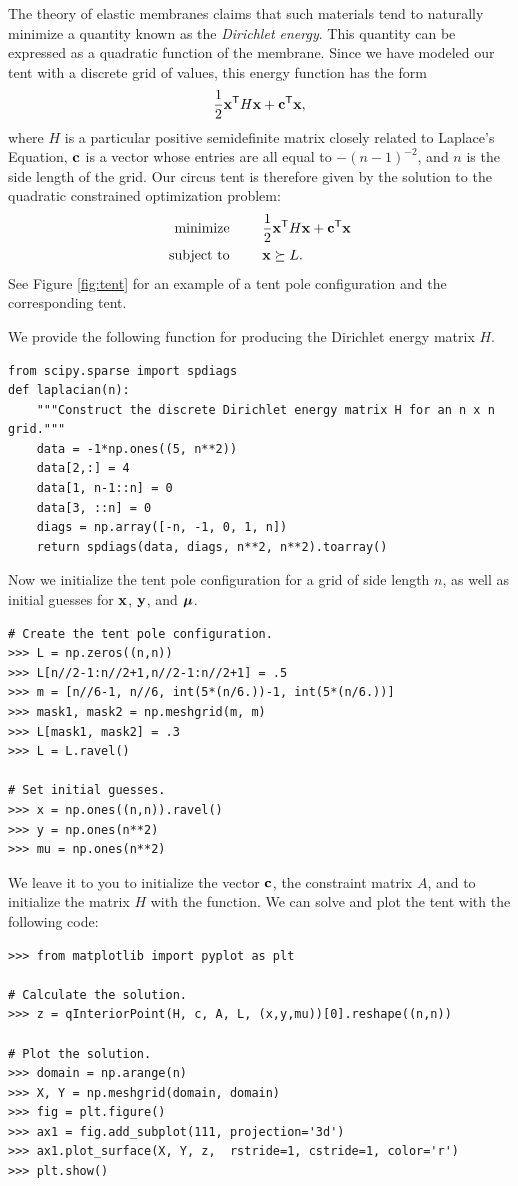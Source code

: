 The theory of elastic membranes claims that such materials tend to naturally minimize a quantity known as the \emph{Dirichlet energy}.
This quantity can be expressed as a quadratic function of the membrane.
Since we have modeled our tent with a discrete grid of values, this energy function has the form \[\frac{1}{2}\mathbf{x}^{\mathsf T}  H \mathbf{x} + \mathbf{c}^{\mathsf T}  \mathbf{x},\] where $H$ is a particular positive semidefinite matrix closely related to Laplace's Equation, $\mathbf{c}$ is a vector whose entries are all equal to $-(n-1)^{-2}$, and $n$ is the side length of the grid.
Our circus tent is therefore given by the solution to the quadratic constrained optimization problem:
\begin{align*}
\text{minimize }\qquad &\frac{1}{2}\mathbf{x}^{\mathsf T}  H \mathbf{x} + \mathbf{c}^{\mathsf T}  \mathbf{x}\\
\text{subject to }\qquad &\mathbf{x} \succeq L.\\
\end{align*}
See Figure \ref{fig:tent} for an example of a tent pole configuration and the corresponding tent.

We provide the following function for producing the Dirichlet energy matrix $H$.
\begin{lstlisting}
from scipy.sparse import spdiags
def laplacian(n):
    """Construct the discrete Dirichlet energy matrix H for an n x n grid."""
    data = -1*np.ones((5, n**2))
    data[2,:] = 4
    data[1, n-1::n] = 0
    data[3, ::n] = 0
    diags = np.array([-n, -1, 0, 1, n])
    return spdiags(data, diags, n**2, n**2).toarray()
\end{lstlisting}
Now we initialize the tent pole configuration for a grid of side length $n$, as well as initial guesses for $\mathbf{x}$, $\mathbf{y}$, and $\boldsymbol{\mu}$.
\begin{lstlisting}
# Create the tent pole configuration.
>>> L = np.zeros((n,n))
>>> L[n//2-1:n//2+1,n//2-1:n//2+1] = .5
>>> m = [n//6-1, n//6, int(5*(n/6.))-1, int(5*(n/6.))]
>>> mask1, mask2 = np.meshgrid(m, m)
>>> L[mask1, mask2] = .3
>>> L = L.ravel()

# Set initial guesses.
>>> x = np.ones((n,n)).ravel()
>>> y = np.ones(n**2)
>>> mu = np.ones(n**2)
\end{lstlisting}
We leave it to you to initialize the vector $\mathbf{c}$, the constraint matrix $A$,
and to initialize the matrix $H$ with the  function.
We can solve and plot the tent with the following code:
\begin{lstlisting}
>>> from matplotlib import pyplot as plt

# Calculate the solution.
>>> z = qInteriorPoint(H, c, A, L, (x,y,mu))[0].reshape((n,n))

# Plot the solution.
>>> domain = np.arange(n)
>>> X, Y = np.meshgrid(domain, domain)
>>> fig = plt.figure()
>>> ax1 = fig.add_subplot(111, projection='3d')
>>> ax1.plot_surface(X, Y, z,  rstride=1, cstride=1, color='r')
>>> plt.show()
\end{lstlisting}

